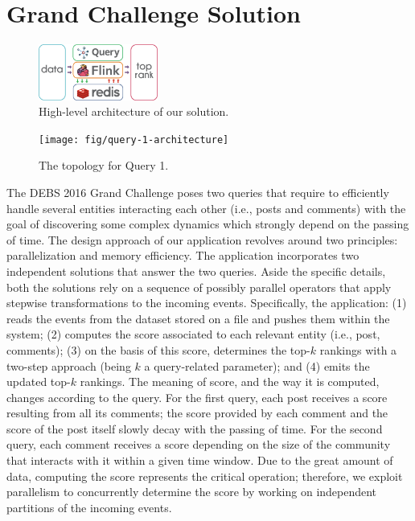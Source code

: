 \section{Grand Challenge Solution}
\label{sec:solution}

\begin{figure}[!ht]
	\centering
	\includegraphics[width=0.35\textwidth]{fig/sostream-layered-architecture.eps}
	\caption{High-level architecture of our solution.}
	\label{fig:sostream-layered-architecture}
\end{figure}

\begin{figure}[!ht]
	\centering
	\texttt{[image: fig/query-1-architecture]}
	\caption{The topology for Query 1.}
	\label{fig:q1-architecture}
\end{figure}

The DEBS 2016 Grand Challenge poses two queries that require to efficiently handle several entities interacting each other (i.e., posts and comments) with the goal of discovering some complex dynamics which strongly depend on the passing of time. 
%
The design approach of our application revolves around two principles: parallelization and memory efficiency.
%
The application incorporates two independent solutions that answer the two queries.
%
Aside the specific details, both the solutions %
rely on a sequence of possibly parallel operators that apply stepwise transformations to the incoming events. 
%
Specifically, the application: (1) reads the events from the dataset stored on a file and pushes them within the system;  (2) computes the score associated to each relevant entity (i.e., post, comments); (3) on the basis of this score, determines the top-$k$ rankings with a two-step  approach (being $k$ a query-related parameter); 
and (4) emits the updated top-$k$ rankings. 
%
The meaning of score, and the way it is computed, changes according to the query.
For the first query, each post receives a score resulting from all its comments; the score provided by each comment and the score of the post itself slowly decay with the passing of time. 
%
For the second query, each comment receives a score depending on the size of the community that interacts with it within a given time window. 
%
Due to the great amount of data, computing the score represents the critical operation; therefore, we exploit parallelism to concurrently determine the score by working on independent partitions of the incoming events. 

